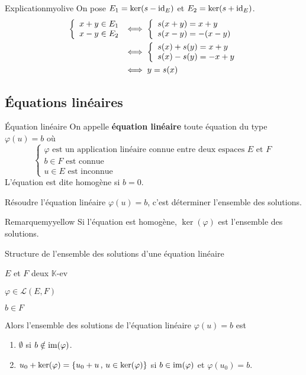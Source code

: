     \begin{demo}{Explication}{myolive}
        On pose $E_1 = \ker(s -\operatorname{id}_E)$ et $E_2 = \ker(s + \operatorname{id}_E)$.
        \begin{align*}
            \et{x+y \in E_1}{x-y \in E_2} & \iff \et{s(x+y) = x+y}{s(x-y) = -(x-y)} \\
            & \iff \et{s(x) + s(y) = x +y }{s(x)- s(y) = -x +y} \\
            & \iff y = s(x)
        \end{align*}
    \end{demo}

\subsection{Équations linéaires}

    \begin{defi}{Équation linéaire}{}
        On appelle \textbf{équation linéaire} toute équation du type $ \varphi (u) = b $ où 
        \[ \left\{ \begin{array}{l}
            \varphi \text{ est un application linéaire connue entre deux espaces } E \text{ et } F \\
            b \in F \text{ est connue} \\
            u \in E \text{ est inconnue}
        \end{array} \right. \]
        L’équation est dite homogène si $b= 0$.
    
        Résoudre l’équation linéaire $\varphi (u) = b$, c’est déterminer l’ensemble des solutions.
    \end{defi}
    
    \begin{omed}{Remarque}{myyellow}
        Si l’équation est homogène, $\ker(\varphi)$ est l’ensemble des solutions.
    \end{omed}
    
    \begin{prop}{Structure de l’ensemble des solutions d’une équation linéaire}{}
        \begin{soient}
            \item $E$ et $F$ deux $\mathbb{K}$-ev
            \item $\varphi \in \mathcal{L}(E,F)$
            \item $b \in F$
        \end{soient}
        Alors l’ensemble des solutions de l’équation linéaire $ \varphi (u) = b $ est 
        \begin{enumerate}
            \item $\emptyset$ si $b \notin \operatorname{im}(\varphi)$.
            \item $ u_0 + \ker(\varphi) = \left\{ u_0 + u \, , \, u \in \ker(\varphi) \right\}$ si $b \in \operatorname{im}(\varphi)$ et $\varphi(u_0) = b$.
        \end{enumerate}
    \end{prop}

